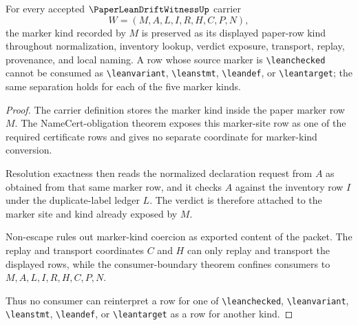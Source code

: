 \begin{theorem}
\label{thm:paper-lean-drift-witness-marker-kind-separation}
For every accepted $\PaperLeanDriftWitnessUp$ carrier
$$
W=(M,A,L,I,R,H,C,P,N),
$$
the marker kind recorded by $M$ is preserved as its displayed paper-row kind throughout normalization, inventory lookup, verdict exposure, transport, replay, provenance, and local naming. A row whose source marker is \texttt{\textbackslash leanchecked} cannot be consumed as \texttt{\textbackslash leanvariant}, \texttt{\textbackslash leanstmt}, \texttt{\textbackslash leandef}, or \texttt{\textbackslash leantarget}; the same separation holds for each of the five marker kinds.
\end{theorem}
\begin{proof}
The carrier definition stores the marker kind inside the paper marker row $M$. The NameCert-obligation theorem exposes this marker-site row as one of the required certificate rows and gives no separate coordinate for marker-kind conversion.

Resolution exactness then reads the normalized declaration request from $A$ as obtained from that same marker row, and it checks $A$ against the inventory row $I$ under the duplicate-label ledger $L$. The verdict is therefore attached to the marker site and kind already exposed by $M$.

Non-escape rules out marker-kind coercion as exported content of the packet. The replay and transport coordinates $C$ and $H$ can only replay and transport the displayed rows, while the consumer-boundary theorem confines consumers to $M,A,L,I,R,H,C,P,N$.

Thus no consumer can reinterpret a row for one of \texttt{\textbackslash leanchecked}, \texttt{\textbackslash leanvariant}, \texttt{\textbackslash leanstmt}, \texttt{\textbackslash leandef}, or \texttt{\textbackslash leantarget} as a row for another kind.
\end{proof}

